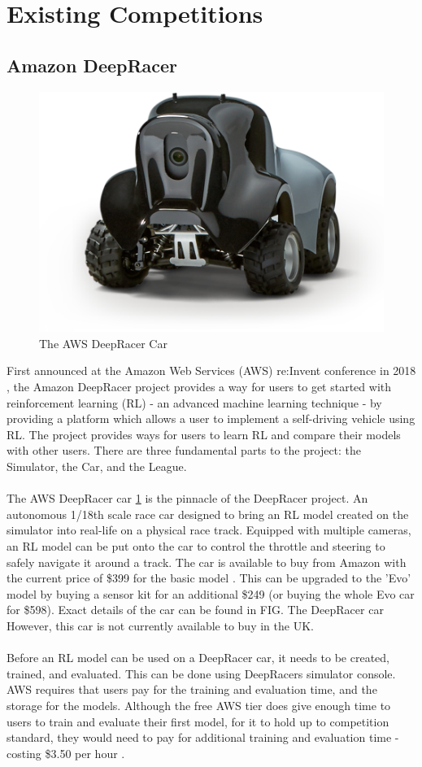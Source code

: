 \documentclass{l4proj}
\begin{document}
\section{Existing Competitions}
\subsection{Amazon DeepRacer}
\begin{figure}
    \centering
    \includegraphics[width=0.5\linewidth]{images/DeepRacer.png}
    \caption{The AWS DeepRacer Car}
    \label{fig:deepcar}
\end{figure}
First announced at the Amazon Web Services (AWS) re:Invent conference in 2018 \citep{Deep18}, the Amazon DeepRacer project \citep{Amz23} provides a way for users to get started with reinforcement learning (RL) - an advanced machine learning technique - by providing a platform which allows a user to implement a self-driving vehicle using RL. The project provides ways for users to learn RL and compare their models with other users. There are three fundamental parts to the project: the Simulator, the Car, and the League.
\\\\
The AWS DeepRacer car \ref{fig:deepcar} is the pinnacle of the DeepRacer project. An autonomous 1/18th scale race car designed to bring an RL model created on the simulator into real-life on a physical race track. Equipped with multiple cameras, an RL model can be put onto the car to control the throttle and steering to safely navigate it around a track. The car is available to buy from Amazon with the current price of \$399 for the basic model \citep{Car}. This can be upgraded to the 'Evo' model by buying a sensor kit for an additional \$249 (or buying the whole Evo car for \$598). Exact details of the car can be found in FIG. The DeepRacer car However, this car is not currently available to buy in the UK.
\\\\
Before an RL model can be used on a DeepRacer car, it needs to be created, trained, and evaluated. This can be done using DeepRacers simulator console. AWS requires that users pay for the training and evaluation time, and the storage for the models. Although the free AWS tier does give enough time to users to train and evaluate their first model, for it to hold up to competition standard, they would need to pay for additional training and evaluation time - costing \$3.50 per hour \citep{Price}.
\end{document}
